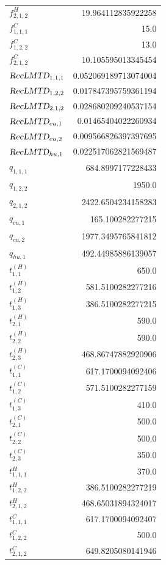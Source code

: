 \documentclass{article}%
\begin{document}
\begin{multicols*}{3}
\begin{supertabular}{lr}
	$f_{2,1,2}^{H}$ & 19.964112835922258 \\%
	$f_{1,1,1}^{C}$ & 15.0 \\%
	$f_{1,2,2}^{C}$ & 13.0 \\%
	$f_{2,1,2}^{C}$ & 10.105595013345454 \\%
	$\textsl{RecLMTD}_{1,1,1}$ & 0.052069189713074004 \\%
	$\textsl{RecLMTD}_{1,2,2}$ & 0.017847395759361194 \\%
	$\textsl{RecLMTD}_{2,1,2}$ & 0.028680209240537154 \\%
	$\textsl{RecLMTD}_{cu,1}$ & 0.01465404022260934 \\%
	$\textsl{RecLMTD}_{cu,2}$ & 0.009566826397397695 \\%
	$\textsl{RecLMTD}_{hu,1}$ & 0.022517062821569487 \\%
	$q_{1,1,1}$ & 684.8997177228433 \\%
	$q_{1,2,2}$ & 1950.0 \\%
	$q_{2,1,2}$ & 2422.6504234158283 \\%
	$q_{cu,1}$ & 165.100282277215 \\%
	$q_{cu,2}$ & 1977.3495765841812 \\%
	$q_{hu,1}$ & 492.44985886139057 \\%
	$t_{1,1}^{(H)}$ & 650.0 \\%
	$t_{1,2}^{(H)}$ & 581.5100282277216 \\%
	$t_{1,3}^{(H)}$ & 386.5100282277215 \\%
	$t_{2,1}^{(H)}$ & 590.0 \\%
	$t_{2,2}^{(H)}$ & 590.0 \\%
	$t_{2,3}^{(H)}$ & 468.86747882920906 \\%
	$t_{1,1}^{(C)}$ & 617.1700094092406 \\%
	$t_{1,2}^{(C)}$ & 571.5100282277159 \\%
	$t_{1,3}^{(C)}$ & 410.0 \\%
	$t_{2,1}^{(C)}$ & 500.0 \\%
	$t_{2,2}^{(C)}$ & 500.0 \\%
	$t_{2,3}^{(C)}$ & 350.0 \\%
	$t_{1,1,1}^{H}$ & 370.0 \\%
	$t_{1,2,2}^{H}$ & 386.5100282277219 \\%
	$t_{2,1,2}^{H}$ & 468.65031894324017 \\%
	$t_{1,1,1}^{C}$ & 617.1700094092407 \\%
	$t_{1,2,2}^{C}$ & 500.0 \\%
	$t_{2,1,2}^{C}$ & 649.8205080141946 \\%

\end{supertabular}
\end{multicols*}
\end{document}
